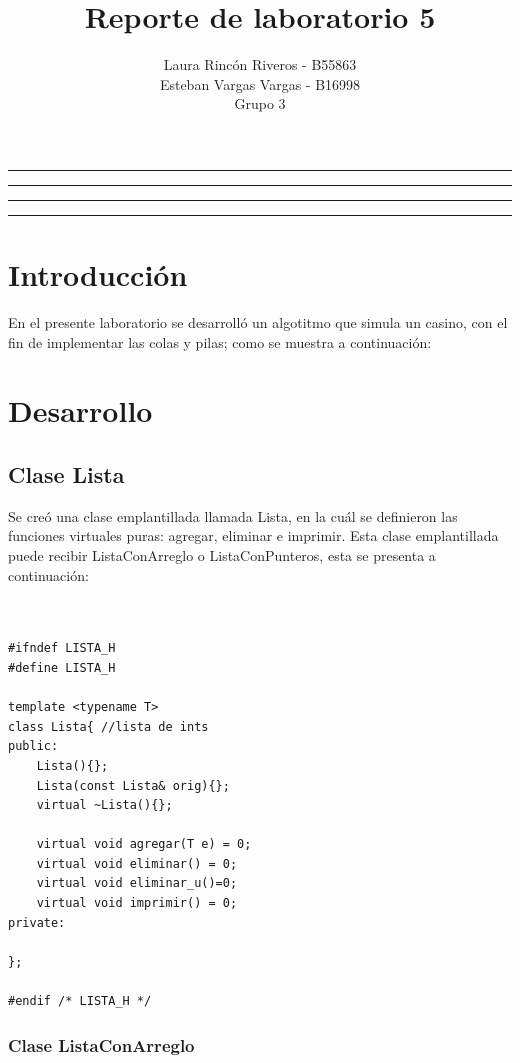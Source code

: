 \documentclass[11pt]{article}
\title{Reporte de laboratorio 5}
\author{Laura Rincón Riveros - B55863\\Esteban Vargas Vargas - B16998\\ Grupo 3}
\begin{document}
\maketitle
\hrule
\hrule
\tableofcontents
\hspace{5mm}
\hrule
\hrule

\section{Introducción}

En el presente laboratorio se desarrolló un algotitmo que simula un casino, con el fin de implementar las colas y pilas; como se muestra a continuación:


\newpage
\section{Desarrollo}

\subsection{Clase Lista}

Se creó una clase emplantillada llamada Lista, en la cuál se definieron las funciones virtuales puras: agregar, eliminar e imprimir. Esta clase emplantillada puede recibir ListaConArreglo o ListaConPunteros, esta se presenta a continuación: 

\lstset {language=C}
\begin{lstlisting}


#ifndef LISTA_H
#define LISTA_H

template <typename T>
class Lista{ //lista de ints
public:
    Lista(){};
    Lista(const Lista& orig){};
    virtual ~Lista(){};

    virtual void agregar(T e) = 0;
    virtual void eliminar() = 0;
    virtual void eliminar_u()=0;
    virtual void imprimir() = 0;
private:

};

#endif /* LISTA_H */

\end{lstlisting}



\newpage
\subsubsection{Clase ListaConArreglo}
\end{document}
